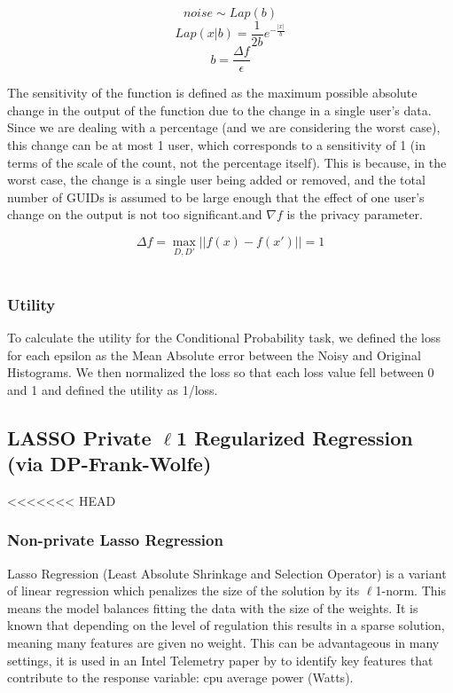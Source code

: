 \documentclass[12pt,letterpaper]{article}
\begin{document}
$$noise \sim Lap(b) $$
$$Lap(x|b) = \frac{1}{2b}e^{-\frac{|x|}{b}}$$
$$b = \frac{\Delta f}{\epsilon}$$

The sensitivity of the function is defined as the maximum possible absolute change in the output of the function due to the change in a single user's data. Since we are dealing with a percentage (and we are considering the worst case), this change can be at most 1 user, which corresponds to a sensitivity of 1 (in terms of the scale of the count, not the percentage itself). This is because, in the worst case, the change is a single user being added or removed, and the total number of GUIDs is assumed to be large enough that the effect of one user's change on the output is not too significant.and $\nabla f$ is the privacy parameter. 
\begin{center}
$$\Delta f = \max_{D, D'} ||f(x) - f(x')|| = 1$$ \\
\end{center}

\subsubsection{Utility}

To calculate the utility for the Conditional Probability task, we defined the loss for each epsilon as the Mean Absolute error between the Noisy and Original Histograms. We then normalized the loss so that each loss value fell between 0 and 1 and defined the utility as 1/loss. 

\subsection{LASSO Private $\ell$1 Regularized Regression (via DP-Frank-Wolfe)}
<<<<<<< HEAD

\subsubsection{Non-private Lasso Regression}

Lasso Regression (Least Absolute Shrinkage and Selection Operator) is a variant of linear regression which penalizes the size of the solution by its $\ell$1-norm. This means the model balances fitting the data with the size of the weights. It is known that depending on the level of regulation this results in a sparse solution, meaning many features are given no weight. This can be advantageous in many settings, it is used in an Intel Telemetry paper by \cite{lassocarbon} to identify key features that contribute to the response variable: cpu average power (Watts). 
\end{document}

